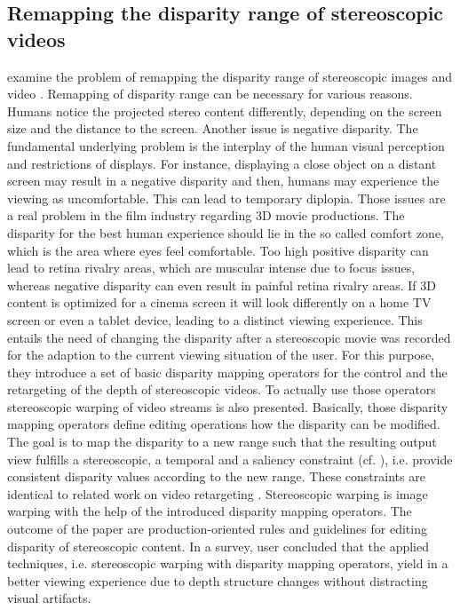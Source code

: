 \subsection{Remapping the disparity range of stereoscopic videos}

\citeauthor{lang2010nonlinear} examine the problem of remapping the disparity range of stereoscopic images and video \citep{lang2010nonlinear}.
Remapping of disparity range can be necessary for various reasons.
Humans notice the projected stereo content differently, depending on the screen size and the distance to the screen.
Another issue is negative disparity.
The fundamental underlying problem is the interplay of the human visual perception and restrictions of displays.
For instance, displaying a close object on a distant screen may result in a negative disparity and then, humans may experience the viewing as uncomfortable.
This can lead to temporary diplopia.
Those issues are a real problem in the film industry regarding 3D movie productions.
The disparity for the best human experience should lie in the so called comfort zone, which is the area where eyes feel comfortable.
Too high positive disparity can lead to retina rivalry areas, which are muscular intense due to focus issues, whereas negative disparity can even result in painful retina rivalry areas.
If 3D content is optimized for a cinema screen it will look differently on a home TV screen or even a tablet device, leading to a distinct viewing experience.
This entails the need of changing the disparity after a stereoscopic movie was recorded for the adaption to the current viewing situation of the user.
For this purpose, they introduce a set of basic disparity mapping operators for the control and the retargeting of the depth of stereoscopic videos.
To actually use those operators stereoscopic warping of video streams is also presented.
Basically, those disparity mapping operators define editing operations how the disparity can be modified.
The goal is to map the disparity to a new range such that the resulting output view fulfills a stereoscopic, a temporal and a saliency constraint (cf. \citep{lang2010nonlinear}), i.e. provide consistent disparity values according to the new range.
These constraints are identical to related work on video retargeting \citep{krahenbuhl2009system}.
Stereoscopic warping is image warping with the help of the introduced disparity mapping operators.
The outcome of the paper are production-oriented rules and guidelines for editing disparity of stereoscopic content.
In a survey, user concluded that the applied techniques, i.e. stereoscopic warping with disparity mapping operators, yield in a better viewing experience due to depth structure changes without distracting visual artifacts.

